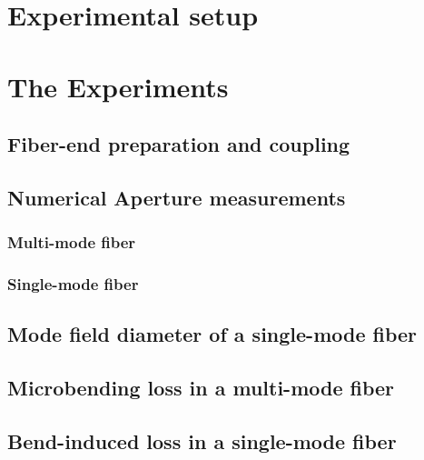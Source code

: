 \documentclass[%
 reprint,
 amsmath,amssymb,
 aps,
]{revtex4-2}
\begin{document}
\section{Experimental setup}	
\section{The Experiments}
\subsection{Fiber-end preparation and coupling}
\subsection{Numerical Aperture measurements}
\subsubsection{Multi-mode fiber}
\subsubsection{Single-mode fiber}
\subsection{Mode field diameter of a single-mode fiber}
\subsection{Microbending loss in a multi-mode fiber}
\subsection{Bend-induced loss in a single-mode fiber}
		
\end{document}
